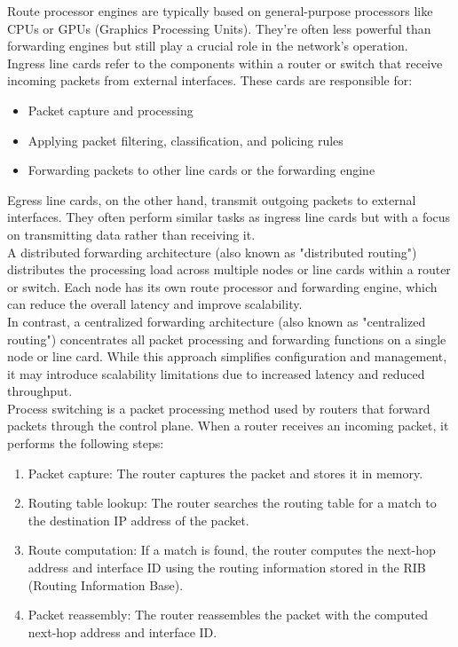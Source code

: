 \documentclass[parindent=0pt]{article}
\begin{document}
Route processor engines are typically based on general-purpose processors like CPUs or GPUs (Graphics Processing Units). They're often less powerful than forwarding engines but still play a crucial role in the network's operation.\\

Ingress line cards refer to the components within a router or switch that receive incoming packets from external interfaces. These cards are responsible for:
	\begin{itemize}
		\item  Packet capture and processing 
		\item  Applying packet filtering, classification, and policing rules 
		\item  Forwarding packets to other line cards or the forwarding engine 
	\end{itemize}

Egress line cards, on the other hand, transmit outgoing packets to external interfaces. They often perform similar tasks as ingress line cards but with a focus on transmitting data rather than receiving it.\\

A distributed forwarding architecture (also known as "distributed routing") distributes the processing load across multiple nodes or line cards within a router or switch. Each node has its own route processor and forwarding engine, which can reduce the overall latency and improve scalability.\\

In contrast, a centralized forwarding architecture (also known as "centralized routing") concentrates all packet processing and forwarding functions on a single node or line card. While this approach simplifies configuration and management, it may introduce scalability limitations due to increased latency and reduced throughput.\\

Process switching is a packet processing method used by routers that forward packets through the control plane. When a 
router receives an incoming packet, it performs the following steps:
	\begin{enumerate}
		\item Packet capture: The router captures the packet and stores it in memory.
		\item Routing table lookup: The router searches the routing table for a match to the destination IP address of the packet.
		\item Route computation: If a match is found, the router computes the next-hop address and interface ID using the routing information stored in the RIB (Routing Information Base).
		\item Packet reassembly: The router reassembles the packet with the computed next-hop address and interface ID.
	\end{enumerate}
\end{document}

